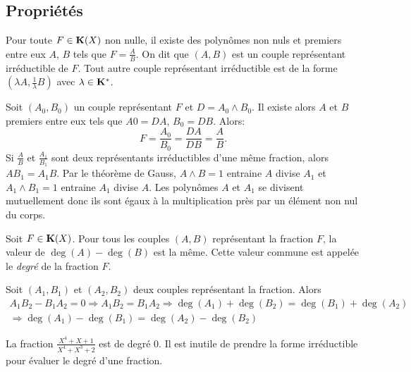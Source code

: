 \subsection{Propriétés}
\begin{prop}
  Pour toute $F\in \mathbf{K}(X)$ non nulle, il existe des polynômes non nuls et premiers entre eux $A$, $B$ tels que $F = \frac{A}{B}$. On dit que  $(A,B)$ est un couple représentant irréductible de $F$. Tout autre couple représentant irréductible est de la forme $(\lambda A, \frac{1}{\lambda}B)$ avec $\lambda \in \mathbf{K}^*$.
\end{prop}
\begin{demo}
  Soit $(A_0,B_0)$ un couple représentant $F$ et $D= A_0 \wedge B_0$. Il existe alors $A$ et $B$ premiers entre eux tels que $A0=DA$, $B_0=DB$. Alors:
\begin{displaymath}
  F = \frac{A_0}{B_0}=\frac{DA}{DB}=\frac{A}{B}.
\end{displaymath}
Si $\frac{A}{B}$ et $\frac{A_1}{B_1}$ sont deux représentants irréductibles d'une même fraction, alors $AB_1=A_1 B$. Par le théorème de Gauss, $A\wedge B = 1$ entraine $A$ divise $A_1$ et $A_1 \wedge B_1=1$ entraine $A_1$ divise $A$. Les polynômes $A$ et $A_1$ se divisent mutuellement donc ils sont égaux à la multiplication près par un élément non nul du corps.
\end{demo}

\begin{prop}
  Soit $F \in \mathbf{K}(X)$. Pour tous les couples $(A,B)$ représentant la fraction $F$, la valeur de $\deg(A)-\deg(B)$ est la même. Cette valeur commune est appelée le \emph{degré} de la fraction $F$.
\end{prop}
\begin{demo}
  Soit $(A_1,B_1)$ et $(A_2,B_2)$ deux couples représentant la fraction. Alors
\begin{multline*}
  A_1B_2 - B_1A_2 = 0 \Rightarrow A_1B_2 = B_1A_2 \Rightarrow \deg(A_1)+\deg(B_2) = \deg(B_1)+\deg(A_2)\\
  \Rightarrow \deg(A_1)-\deg(B_1) = \deg(A_2) - \deg(B_2)
\end{multline*}
\end{demo}
\begin{rem}
  La fraction $\frac{X^4 + X +1}{X^4 + X^3 + 2}$ est de degré $0$. Il est inutile de prendre la forme irréductible pour évaluer le degré d'une fraction.
\end{rem}

